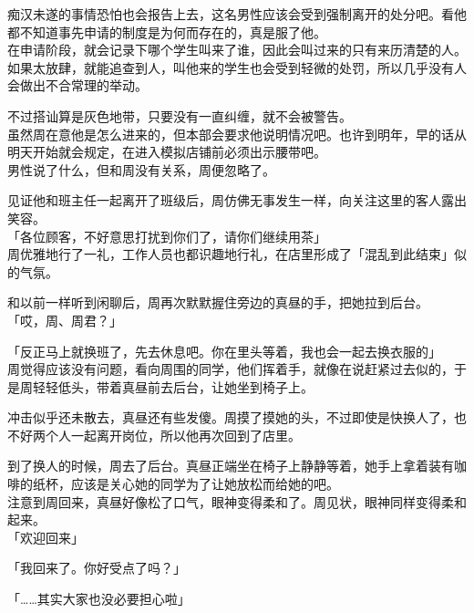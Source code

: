 痴汉未遂的事情恐怕也会报告上去，这名男性应该会受到强制离开的处分吧。看他都不知道事先申请的制度是为何而存在的，真是服了他。\\

在申请阶段，就会记录下哪个学生叫来了谁，因此会叫过来的只有来历清楚的人。如果太放肆，就能追查到人，叫他来的学生也会受到轻微的处罚，所以几乎没有人会做出不合常理的举动。

不过搭讪算是灰色地带，只要没有一直纠缠，就不会被警告。\\

虽然周在意他是怎么进来的，但本部会要求他说明情况吧。也许到明年，早的话从明天开始就会规定，在进入模拟店铺前必须出示腰带吧。\\

男性说了什么，但和周没有关系，周便忽略了。

见证他和班主任一起离开了班级后，周仿佛无事发生一样，向关注这里的客人露出笑容。\\

「各位顾客，不好意思打扰到你们了，请你们继续用茶」\\

周优雅地行了一礼，工作人员也都识趣地行礼，在店里形成了「混乱到此结束」似的气氛。

和以前一样听到闲聊后，周再次默默握住旁边的真昼的手，把她拉到后台。\\

「哎，周、周君？」

「反正马上就换班了，先去休息吧。你在里头等着，我也会一起去换衣服的」\\

周觉得应该没有问题，看向周围的同学，他们挥着手，就像在说赶紧过去似的，于是周轻轻低头，带着真昼前去后台，让她坐到椅子上。

冲击似乎还未散去，真昼还有些发傻。周摸了摸她的头，不过即使是快换人了，也不好两个人一起离开岗位，所以他再次回到了店里。\\

\vspace{2\baselineskip}

到了换人的时候，周去了后台。真昼正端坐在椅子上静静等着，她手上拿着装有咖啡的纸杯，应该是关心她的同学为了让她放松而给她的吧。\\

注意到周回来，真昼好像松了口气，眼神变得柔和了。周见状，眼神同样变得柔和起来。\\

「欢迎回来」

「我回来了。你好受点了吗？」

「……其实大家也没必要担心啦」

